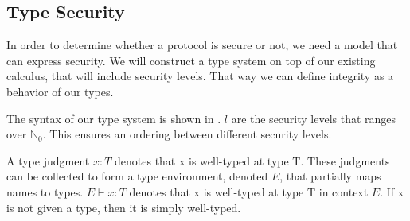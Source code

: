 \subsection{Type Security}
In order to determine whether a protocol is secure or not, we need a model that can express security.
We will construct a type system on top of our existing calculus, that will include security levels.
That way we can define integrity as a behavior of our types.


\noindent The syntax of our type system is shown in .
$l$ are the security levels that ranges over $\mathbb{N}_0$.
This ensures an ordering between different security levels.


\noindent A type judgment $x:T$ denotes that x is well-typed at type T.
These judgments can be collected to form a type environment, denoted $E$, that partially maps names to types.
$E\vdash x:T$ denotes that x is well-typed at type T in context $E$.
If x is not given a type, then it is simply well-typed.


